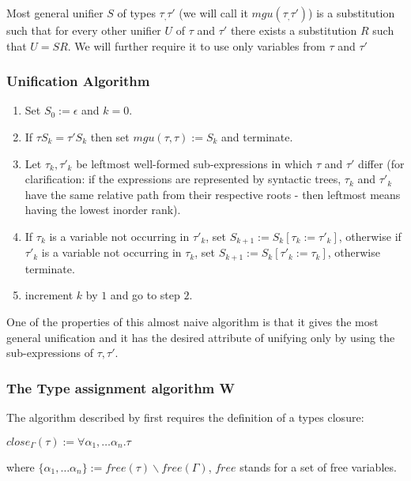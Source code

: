 Most general unifier $S$ of types $\tau_, \tau'$ (we will call it $mgu (\tau_, \tau')$) is a substitution such that for every other unifier $U$ of $\tau$ and $\tau'$  there exists a substitution $R$ such that $U = S R$. %
We will further require it to use only variables from $\tau$ and $\tau'$

\subsubsection{Unification Algorithm}

\begin{enumerate}
    \item Set $S_0 := \epsilon$ and $k = 0$.
    \item If $\tau S_k = \tau' S_k$ then set $mgu(\tau,\tau) := S_k$ and terminate.
    \item Let $\tau_k, \tau'_k$ be leftmost well-formed sub-expressions in which $\tau$ and $\tau'$ differ (for clarification: if the expressions are represented by syntactic trees, $\tau_k$ and $\tau'_k$ have the same relative path from their respective roots - then leftmost means having the lowest inorder rank).
    \item If $\tau_k$ is a variable not occurring in $\tau'_k$, set $S_{k+1} := S_k [\tau_k := \tau'_k]$, otherwise if $\tau'_k$ is a variable not occurring in $\tau_k$, set $S_{k+1} := S_k [\tau'_k := \tau_k]$, otherwise terminate.
    \item increment $k$ by $1$ and go to step $2$.
\end{enumerate}

One of the properties of this almost naive algorithm is that it gives the most general unification and it has the desired attribute of unifying only by using the sub-expressions of $\tau, \tau'$.

\subsubsection{The Type assignment algorithm W}


The algorithm described by %
first requires the definition of a types closure:

$close_\Gamma(\tau) := \forall \alpha_1, \dots \alpha_n . \tau$

where $\{\alpha_1, \dots \alpha_n\} := free(\tau) \backslash free(\Gamma)$, $free$ stands for a set of free variables. %

